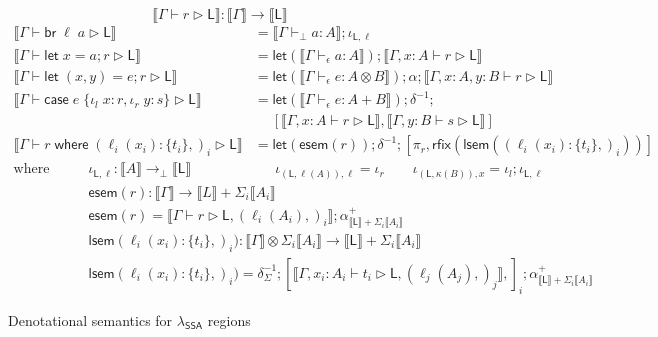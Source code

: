 \documentclass[acmsmall,screen,review]{acmart}
\newcommand{\ms}[1]{\ensuremath{\mathsf{#1}}}
\newcommand{\lto}{:}
\newcommand{\linl}[1]{\iota_l\;{#1}}
\newcommand{\linr}[1]{\iota_r\;{#1}}
\newcommand{\letstmt}[3]{\ensuremath{\ms{let}\;#1 = #2; #3}}
\newcommand{\brb}[2]{\ms{br}\;#1\;#2}
\newcommand{\casestmt}[5]{\ms{case}\;#1\;\{\linl{#2} \lto #3, \linr{#4} \lto #5\}}
\newcommand{\where}[2]{#1\;\ms{where}\;#2}
\newcommand{\wbranch}[3]{#1(#2) \lto \{#3\}}
\newcommand{\bhyp}[2]{#1 : #2}
\newcommand{\lhyp}[2]{#1(#2)}
\newcommand{\hasty}[4]{#1 \vdash_{#2} #3: {#4}}
\newcommand{\haslb}[3]{#1 \vdash #2 \rhd #3}
\newcommand{\dnt}[1]{\llbracket{#1}\rrbracket}
\newcommand{\entrymor}[1]{\ms{esem}(#1)}
\newcommand{\loopmor}[1]{\ms{lsem}(#1)}
\newcommand{\lmor}[1]{\ms{let}(#1)}
\newcommand{\rfix}[1]{\ms{rfix}(#1)}
\newcommand{\isotopessa}{\(\lambda_{\ms{SSA}}\)}
\begin{document}
\begin{figure}
  \begin{equation*}
    \boxed{\dnt{\haslb{\Gamma}{r}{\ms{L}}} : \dnt{\Gamma} \to \dnt{\ms{L}}}
  \end{equation*}
  \begin{align*}
    \dnt{\haslb{\Gamma}{\brb{\ell}{a}}{\ms{L}}} 
      &= \dnt{\hasty{\Gamma}{\bot}{a}{A}} ; \iota_{\ms{L}, \ell}
      \\
    \dnt{\haslb{\Gamma}{\letstmt{x}{a}{r}}{\ms{L}}}
      &= \lmor{\dnt{\hasty{\Gamma}{\epsilon}{a}{A}}}
      ; \dnt{\haslb{\Gamma, \bhyp{x}{A}}{r}{\ms{L}}} 
      \\
    \dnt{\haslb{\Gamma}{\letstmt{(x, y)}{e}{r}}{\ms{L}}}
      &= \lmor{\dnt{\hasty{\Gamma}{\epsilon}{e}{A \otimes B}}} ; \alpha
      ; \dnt{\haslb{\Gamma, \bhyp{x}{A}, \bhyp{y}{B}}{r}{\ms{L}}} 
      \\ 
    \dnt{\haslb{\Gamma}{\casestmt{e}{x}{r}{y}{s}}{\ms{L}}}
      &= \lmor{\dnt{\hasty{\Gamma}{\epsilon}{e}{A + B}}}
      ; \delta^{-1} ;
      \\&\quad\;
      [
        \dnt{\haslb{\Gamma, \bhyp{x}{A}}{r}{\ms{L}}},
        \dnt{\haslb{\Gamma, \bhyp{y}{B}}{s}{\ms{L}}}
      ]
      \\
    \dnt{\haslb{\Gamma}{\where{r}{(\wbranch{\ell_i}{x_i}{t_i},)_i}}{\ms{L}}}
      &= \lmor{\entrymor{r}} 
      ; \delta^{-1} 
      ; [\pi_r, \rfix{\loopmor{(\wbranch{\ell_i}{x_i}{t_i},)_i}} ]
  \end{align*} 
  \begin{align*}
    \text{where} \qquad 
    & \boxed{\iota_{\ms{L}, \ell} : \dnt{A} \to_\bot \dnt{\ms{L}}} \qquad \qquad \qquad
    \iota_{(\ms{L}, \ell(A)), \ell} = \iota_r \qquad
    \iota_{(\ms{L}, \kappa(B)), x} = \iota_l ; \iota_{\ms{L}, \ell} \\
    & \boxed{\entrymor{r} : \dnt{\Gamma} \to \dnt{L} + \Sigma_i\dnt{A_i}} \\
    & \entrymor{r} = \dnt{\haslb{\Gamma}{r}{\ms{L}, (\lhyp{\ell_i}{A_i},)_i}} 
    ; \alpha^+_{\dnt{\ms{L}} + \Sigma_i \dnt{A_i}} \\
    & \boxed{\loopmor{\wbranch{\ell_i}{x_i}{t_i},)_i} 
      : \dnt{\Gamma} \otimes \Sigma_i\dnt{A_i} \to \dnt{\ms{L}} + \Sigma_i\dnt{A_i}}
    \\
    & \loopmor{\wbranch{\ell_i}{x_i}{t_i},)_i} = \delta^{-1}_{\Sigma} 
      ; [ \dnt{\haslb{\Gamma, \bhyp{x_i}{A_i}}{t_i}{\ms{L}, (\lhyp{\ell_j}{A_j},)_j}}, ]_i
      ; \alpha^+_{\dnt{\ms{L}} + \Sigma_i \dnt{A_i}}  
  \end{align*}
  \caption{Denotational semantics for \isotopessa{} regions}
  \label{fig:ssa-reg-sem}
\end{figure}
\end{document}
